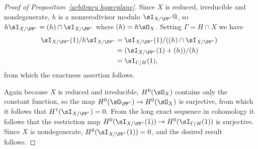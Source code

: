 \begin{proof}[Proof of Proposition~\ref{arbitrary hyperplane}]
Since
$X$ is reduced, irreducible and  \null nondegenerate,
$h$ is a nonzerodivisor modulo 
$\sI_{X/\PP^r}@$, so $h\sI_{X/\PP^r} = (h)\cap \sI_{X/\PP^r}$ where
$(h) = h\sO_{X}$. 
Setting $\Gamma = {H\cap X}$
we have 
$$
\begin{aligned}
\sI_{X/\PP^r}(1)/h\sI_{X/\PP^r} &= \sI_{X/\PP^r}(1)/((h)\cap\sI_{X/\PP^r})\\
 &=(\sI_{X/\PP^r}(1)+(h))/(h)\\
 &= \sI_{\Gamma/H}(1),
\end{aligned}
$$
from which the exactness assertion follows.
 
 Again because $X$ is reduced and irreducible, $H^0(\sO_X)$ contains only the constant function, so the map $H^0(\sO_{\PP^r}) \to H^0(\sO_X)$ is surjective, 
from which it follows that $H^1(\sI_{X/\PP^r}) = 0.$ From the long exact sequence in cohomology it follows that
 the restriction map $H^0(\sI_{X/\PP^r}(1))\to H^0(\sI_{\Gamma/H}(1))$ is surjective. Since
$X$ is nondegenerate, $H^0(\sI_{X/\PP^r}(1)) = 0$, and the desired result follows.
\unif
\end{proof}


